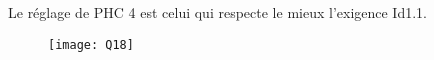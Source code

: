 \begin{multicols}{2}
\fi

\ifprof
\begin{corrige}
Le réglage de PHC 4 est celui qui respecte le mieux l’exigence Id1.1. 

\begin{figure}[H]
\centering
\texttt{[image: Q18]}
\end{figure}


\end{corrige}
\else
\fi


%
%
%
%
%
%
%

\end{multicols}

